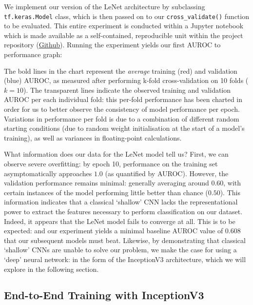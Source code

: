 \noindent
We implement our version of the LeNet architecture by subclassing \texttt{tf.keras.Model} class, which is then passed on to our \texttt{cross_validate()} function to be evaluated. This entire experiment is conducted within a Jupyter notebook which is made available as a self-contained, reproducible unit within the project repository (\href{https://github.com/ShenZhouHong/radiography-ai-project/blob/master/python/initial-evaluation/lenet1998.ipynb}{Github}). Running the experiment yields our first AUROC to performance graph:



The bold lines in the chart represent the \emph{average} training (red) and validation (blue) AUROC, as measured after performing k-fold cross-validation on 10 folds (\(k = 10\)). The transparent lines indicate the observed training and validation AUROC per each individual fold: this per-fold performance has been charted in order for us to better observe the consistency of model performance per epoch. Variations in performance per fold is due to a combination of different random starting conditions (due to random weight initialisation at the start of a model's training), as well as variances in floating-point calculations.

What information does our data for the LeNet model tell us? First, we can observe severe overfitting: by epoch 10, performance on the training set asymptomatically approaches $1.0$ (as quantified by AUROC). However, the validation performance remains minimal: generally averaging around $0.60$, with certain instances of the model performing little better than chance ($0.50$). This information indicates that a classical \enquote*{shallow} CNN lacks the representational power to extract the features necessary to perform classification on our dataset. Indeed, it appears that the LeNet model fails to converge at all. This is to be expected: and our experiment yields a minimal baseline AUROC value of $0.608$ that our subsequent models must beat. Likewise, by demonstrating that classical \enquote*{shallow} CNNs are unable to solve our problem, we make the case for using a \enquote*{deep} neural network: in the form of the InceptionV3 architecture, which we will explore in the following section.

\subsection{End-to-End Training with InceptionV3}


